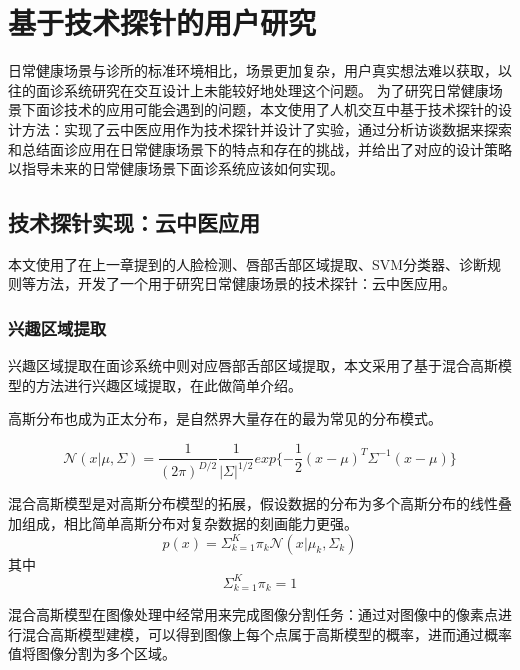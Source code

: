 \chapter{基于技术探针的用户研究}

日常健康场景与诊所的标准环境相比，场景更加复杂，用户真实想法难以获取，以往的面诊系统研究在交互设计上未能较好地处理这个问题。
为了研究日常健康场景下面诊技术的应用可能会遇到的问题，本文使用了人机交互中基于技术探针的设计方法：实现了云中医应用作为技术探针并设计了实验，通过分析访谈数据来探索和总结面诊应用在日常健康场景下的特点和存在的挑战，并给出了对应的设计策略以指导未来的日常健康场景下面诊系统应该如何实现。

\section{技术探针实现：云中医应用}

本文使用了在上一章提到的人脸检测、唇部舌部区域提取、SVM分类器、诊断规则等方法，开发了一个用于研究日常健康场景的技术探针：云中医应用。

\subsection{兴趣区域提取}
兴趣区域提取在面诊系统中则对应唇部舌部区域提取，本文采用了基于混合高斯模型的方法进行兴趣区域提取，在此做简单介绍。

高斯分布也成为正太分布，是自然界大量存在的最为常见的分布模式。

\begin{equation}
    \mathcal{N}(x | \mu, \Sigma) = \frac{1}{(2\pi)^{D/2}}\frac{1}{|\Sigma|^{1/2}}exp\{-\frac{1}{2}(x-\mu)^T\Sigma^{-1}(x-\mu)\}
\end{equation}

混合高斯模型是对高斯分布模型的拓展，假设数据的分布为多个高斯分布的线性叠加组成，相比简单高斯分布对复杂数据的刻画能力更强。
\begin{equation}
p(x) = \Sigma^K_{k=1}\pi_k\mathcal{N}(x|\mu_k,\Sigma_k)
\end{equation}
其中
\begin{equation}
\Sigma^K_{k=1}\pi_k = 1
\end{equation}

混合高斯模型在图像处理中经常用来完成图像分割任务：通过对图像中的像素点进行混合高斯模型建模，可以得到图像上每个点属于高斯模型的概率，进而通过概率值将图像分割为多个区域。

